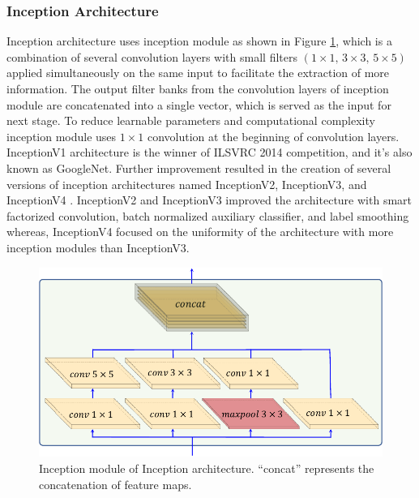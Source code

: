 \subsubsection{Inception Architecture}
Inception architecture \cite{Szegedy2015} uses inception module as shown in Figure \ref{fig:Inception}, which is a combination of several convolution layers with small filters $\left ( 1\times1,\,3\times3,\,5\times5\right )$ applied simultaneously on the same input to facilitate the extraction of more information. The output filter banks from the convolution layers of inception module are concatenated into a single vector, which is served as the input for next stage. To reduce learnable parameters and computational complexity inception module uses $1\times1$ convolution at the beginning of convolution layers. InceptionV1 architecture is the winner of ILSVRC 2014 competition, and it’s also known as GoogleNet. Further improvement resulted in the creation of several versions of inception architectures named InceptionV2, InceptionV3, and InceptionV4 \cite{Szegedy2016, Szegedy2017}.  InceptionV2 and InceptionV3 improved the architecture with smart factorized convolution, batch normalized auxiliary classifier, and label smoothing whereas, InceptionV4 focused on the uniformity of the architecture with more inception modules than InceptionV3.
\begin{figure}[htb!]
	\centering
	\includegraphics[width=\textwidth,keepaspectratio]{images/pretraining/Inception-cropped.pdf}
	\caption[Inception module of Inception architecture]{Inception module of Inception architecture. \enquote{concat} represents the concatenation of feature maps.}
	\label{fig:Inception}
\end{figure}

